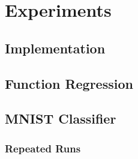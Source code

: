 \chapter{Experiments}
\section{Implementation}

\section{Function Regression}

\section{MNIST Classifier}
\subsection{Repeated Runs}
